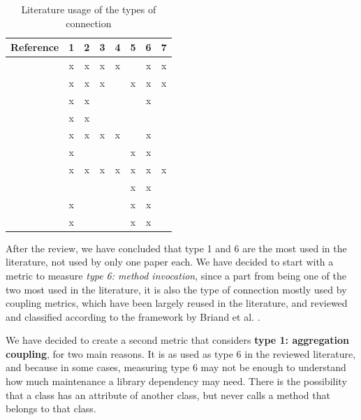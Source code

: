 \documentclass[a4paper]{article}
\begin{document}
\begin{table}[ht!]
    \centering
    \begin{tabular}{|l|c|c|c|c|c|c|c|}
         \hline
         Reference                      & 1 & 2 & 3 & 4 & 5 & 6 & 7 \\\hline
         \cite{eder1994coupling}        & x & x & x & x &   & x & x \\\hline
         \cite{hitz1995measuring}       & x & x & x &   & x & x & x \\\hline
         \cite{briand1997investigation} & x & x &   &   &   & x &   \\\hline
         \cite{wilkie2000coupling}      & x & x &   &   &   &   &   \\\hline
         \cite{yang2005detecting}       & x & x & x & x &   & x &   \\\hline
         \cite{gui2007ranking}          & x &   &   &   & x & x &   \\\hline
         \cite{gupta2009package}        & x & x & x & x & x & x & x \\\hline
         \cite{harrison1998coupling}    &   &   &   &   & x & x &   \\\hline
         \cite{du2004refactoring}       & x &   &   &   & x & x &   \\\hline
         \cite{koetter2019assessing}    & x &   &   &   & x & x &   \\\hline
    \end{tabular}
    \caption{Literature usage of the types of connection}
    \label{tab:type-con-literature}
\end{table}

 After the review, we have concluded that type 1 and 6 are the most used in the literature, not used by only one paper each. We have decided to start with a metric to measure \textit{type 6: method invocation}, since a part from being one of the two most used in the literature, it is also the type of connection mostly used by coupling metrics, which have been largely reused in the literature, and reviewed and classified according to the framework by Briand et al. \cite{briand1999unified}.

We have decided to create a second metric that considers \textbf{type 1: aggregation coupling}, for two main reasons. It is as used as type 6 in the reviewed literature, and because in some cases, measuring type 6 may not be enough to understand how much maintenance a library dependency may need. There is the possibility that a class has an attribute of another class, but never calls a method that belongs to that class.
\end{document}
